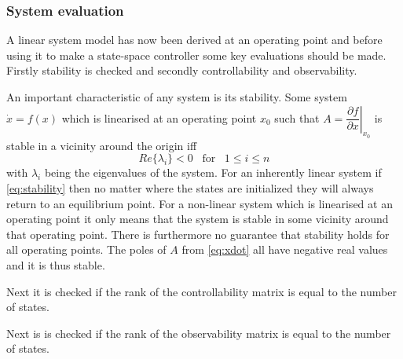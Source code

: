 \subsubsection{System evaluation}
A linear system model has now been derived at an operating point and before using it to make a state-space controller some key evaluations should be made. Firstly stability is checked and secondly controllability and observability.

\medskip
An important characteristic of any system is its stability. Some system $ \dot x = f(x) $ which is linearised at an operating point $ x_0 $ such that $ A = \left. \dfrac{\partial f}{\partial x} \right| _{x_0} $ is stable in a vicinity around the origin iff
\begin{equation}\label{eq:stability}
	Re\{\lambda_i\} < 0 \;\;\; \text{for} \;\;\; 1 \leq i \leq n
\end{equation}
with $ \lambda_i $ being the eigenvalues of the system. For an inherently linear system if \cref{eq:stability} then no matter where the states are initialized they will always return to an equilibrium point. For a non-linear system which is linearised at an operating point it only means that the system is stable in some vicinity around that operating point. There is furthermore no guarantee that stability holds for all operating points. The poles of $ A $ from \cref{eq:xdot} all have negative real values and it is thus stable.

\medskip
Next it is checked if the rank of the controllability matrix is equal to the number of states.

\medskip
Next is is checked if the rank of the observability matrix is equal to the number of states.


